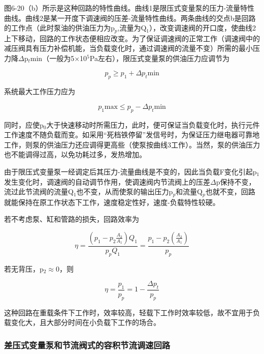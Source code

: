 图6-20（b）所示是这种回路的特性曲线。曲线1是限压式变量泵的压力-流量特性曲线。曲线2是某一开度下调速阀的压差-流量特性曲线。两条曲线的交点b是回路的工作点（此时泵油的供油压力为p$_p$,流量为Q$_1$），改变调速阀的开口度，使曲线2上下移动，回路的工作状态便相应改变。为了保证调速阀的正常工作（调速阀中的减压阀具有压力补偿机能，当负载变化时，通过调速阀的流量不变）所需的最小压力降$\Delta$p$_t$$\text{min}$（一般为5$\times$10$^5$Pa左右），限压式变量泵的供油压力应调节为

\begin{equation}
  p_p\geq p_1+\Delta p_t \text{min}
\end{equation}

\noindent 系统最大工作压力应为

\begin{equation}
  p_1 \text{max} \leq p_p-\Delta p_t \text{min}
\end{equation}

\noindent 同时，应使p$_0$大于快速移动时所需压力，此时，便可保证当负载变化时，执行元件工作速度不随负载而变。如采用“死档铁停留”发信号时，为保证压力继电器可靠地工作，则泵的供油压力还应调得更高些（使泵按曲线3工作）。当然，泵的供油压力也不能调得过高，以免功耗过多，发热增加。

由于限压式变量泵一经调定后其压力-流量曲线是不变的，因此当负载F变化引起p$_1$发生变化时，调速阀的自动调节作用，使调速阀内节流阀上的压差$\Delta$p保持不变，流过此节流阀的流量Q$_1$也不变，从而使泵的输出压力p$_p$和流量Q$_p$也就不变，回路就能保持在原工作状态下工作，速度稳定性好，速度-负载特性较硬。

若不考虑泵、缸和管路的损失，回路效率为

\begin{equation}
  \eta= \frac{({p_1-{p_2 \frac{A_2}{A_1}}})Q_1}{p_pQ_1}= \frac{p_1-{p_2( \frac{A_2}{A_1})}}{p_p}
\end{equation}

\noindent 若无背压，p$_2$$\approx$0，则

\begin{equation}
  \eta= \frac{p_1}{p_p}=1-\frac{\Delta p_t}{p_p}
\end{equation}

这种回路在重载条件下工作时，效率较高，轻载下工作时效率较低，故不宜用于负载变化大，且大部分时间在小负载下工作的场合。

\subsubsection{差压式变量泵和节流阀式的容积节流调速回路}

